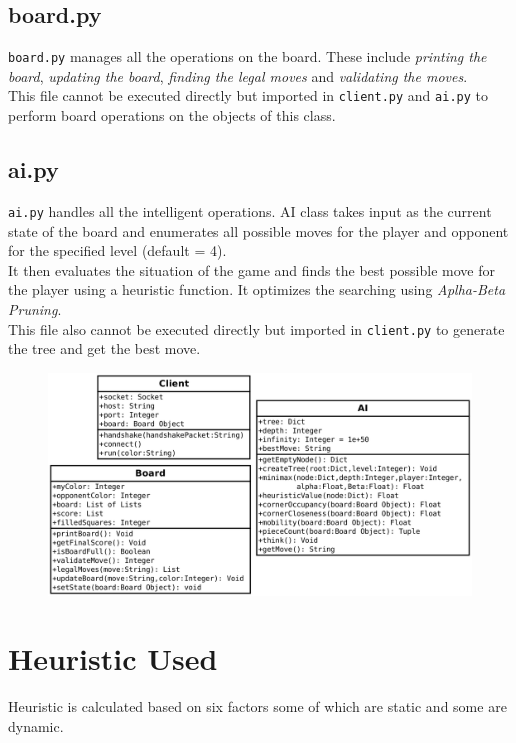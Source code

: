 \documentclass[a4paper,10pt]{article}
\begin{document}
\subsection*{board.py}
\texttt{board.py} manages all the operations on the board. These include \textit{printing the board}, \textit{updating the board}, \textit{finding the legal moves} and \textit{validating the moves}.\\[0.2cm]
This file cannot be executed directly but imported in \texttt{client.py} and \texttt{ai.py} to perform board operations on the objects of this class.

\subsection*{ai.py}
\texttt{ai.py} handles all the intelligent operations. AI class takes input as the current state of the board and enumerates all possible moves for the player and opponent for the specified level (default = 4).\\[0.2cm]
It then evaluates the situation of the game and finds the best possible move for the player using a heuristic function. It optimizes the searching using \textit{Aplha-Beta Pruning}.\\[0.2cm]
This file also cannot be executed directly but imported in \texttt{client.py} to generate the tree and get the best move.

\begin{figure}[h]
\vspace{1cm}
\centering
\includegraphics[scale=0.42]{Classes.pdf}
\end{figure}

\newpage
\section*{Heuristic Used}
Heuristic is calculated based on six factors some of which are static and some are dynamic.
\end{document}
